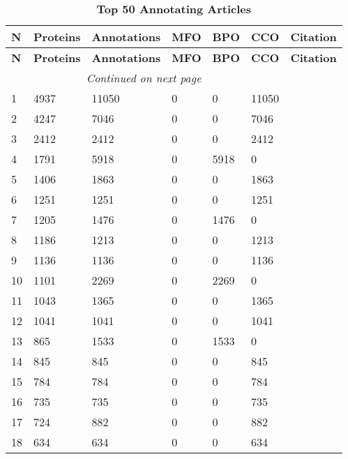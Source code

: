 \begin{longtable}[!ht]{|l|l|l|l|l|l|l|}
\caption{\textbf{Top 50 Annotating Articles}} \\
\hline
\textbf{N}&\textbf{Proteins}&\textbf{Annotations}&\textbf{MFO}&
\textbf{BPO}&\textbf{CCO}&\textbf{Citation}\\\hline
\endfirsthead
\hline
\textbf{N}&\textbf{Proteins}&\textbf{Annotations}&\textbf{MFO}&
\textbf{BPO}&\textbf{CCO}&\textbf{Citation}\\\hline
\endhead
\hline \multicolumn{4}{r}{\textit{Continued on next page}} \\
\endfoot
\hline
\endlastfoot
1 & 4937 & 11050 & 0 & 0 & 11050 & \cite{pmid18029348} \\ \hline
2 & 4247 & 7046 & 0 & 0 & 7046 & \cite{pmid16823372} \\ \hline
3 & 2412 & 2412 & 0 & 0 & 2412 & \cite{pmid18614015} \\ \hline
4 & 1791 & 5918 & 0 & 5918 & 0 & \cite{pmid14551910} \\ \hline
5 & 1406 & 1863 & 0 & 0 & 1863 & \cite{pmid14562095} \\ \hline
6 & 1251 & 1251 & 0 & 0 & 1251 & \cite{pmid18431481} \\ \hline
7 & 1205 & 1476 & 0 & 1476 & 0 & \cite{pmid15791247} \\ \hline
8 & 1186 & 1213 & 0 & 0 & 1213 & \cite{pmid14651853} \\ \hline
9 & 1136 & 1136 & 0 & 0 & 1136 & \cite{pmid17317660} \\ \hline
10 & 1101 & 2269 & 0 & 2269 & 0 & \cite{pmid12529635} \\ \hline
11 & 1043 & 1365 & 0 & 0 & 1365 & \cite{pmid15525680} \\ \hline
12 & 1041 & 1041 & 0 & 0 & 1041 & \cite{pmid21166475} \\ \hline
13 & 865 & 1533 & 0 & 1533 & 0 & \cite{pmid15489339} \\ \hline
14 & 845 & 845 & 0 & 0 & 845 & \cite{pmid16823961} \\ \hline
15 & 784 & 784 & 0 & 0 & 784 & \cite{pmid21533090} \\ \hline
16 & 735 & 735 & 0 & 0 & 735 & \cite{pmid14532352} \\ \hline
17 & 724 & 882 & 0 & 0 & 882 & \cite{pmid20061580} \\ \hline
18 & 634 & 634 & 0 & 0 & 634 & \cite{pmid15028209} \\ \hline

\end{longtable}
